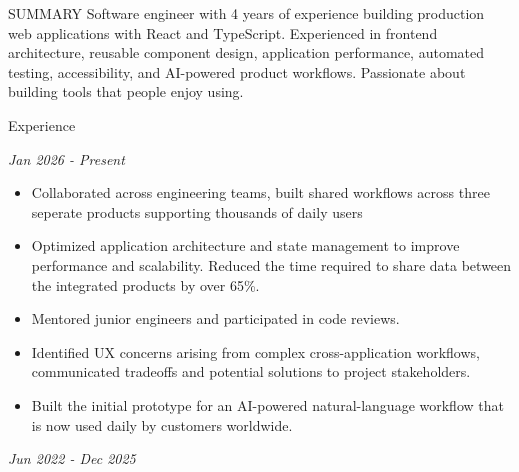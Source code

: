 \documentclass{resume} %
\begin{document}
\begin{rSection}{SUMMARY}
    Software engineer with 4 years of experience building production web applications with React and TypeScript. Experienced in frontend architecture, reusable component design, application performance, automated testing, accessibility, and AI-powered product workflows. Passionate about building tools that people enjoy using.
\end{rSection}


\begin{rSection}{Experience}

    \par
    \smallskip

     \hfill {\em Jan 2026 - Present}


    \begin{itemize}
        \item Collaborated across engineering teams, built shared workflows across three seperate products supporting thousands of daily users
        \item Optimized application architecture and state management to improve performance and scalability. Reduced the time required to share data between the integrated products by over 65\%.
        \item Mentored junior engineers and participated in code reviews.
        \item Identified UX concerns arising from complex cross-application workflows, communicated tradeoffs and potential solutions to project stakeholders.
        \item Built the initial prototype for an AI-powered natural-language workflow that is now used daily by customers worldwide.

    \end{itemize}

    \par
    \smallskip

     \hfill {\em Jun 2022 - Dec 2025}



\end{rSection}
\end{document}
